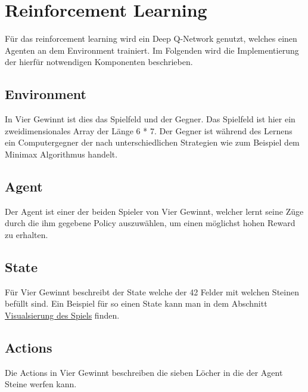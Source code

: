 \section{Reinforcement Learning}
Für das reinforcement learning wird ein Deep Q-Network genutzt, welches einen Agenten an dem Environment trainiert. Im Folgenden wird die Implementierung der hierfür notwendigen Komponenten beschrieben. 


\subsection{Environment}
In Vier Gewinnt ist dies das Spielfeld und der Gegner. Das Spielfeld ist hier ein zweidimensionales Array der Länge 6 * 7. Der Gegner ist während des Lernens ein Computergegner der nach unterschiedlichen Strategien wie zum Beispiel dem Minimax Algorithmus handelt. \\

\subsection{Agent}
Der Agent ist einer der beiden Spieler von Vier Gewinnt, welcher lernt seine Züge durch die ihm gegebene Policy auszuwählen, um einen möglichst hohen Reward zu erhalten.\\

\subsection{State}
 Für Vier Gewinnt beschreibt der State welche der 42 Felder mit welchen Steinen befüllt sind. Ein Beispiel für so einen State kann man in dem Abschnitt \hyperref[sec:visualisierung]{Visualsierung des Spiels} finden.\\


\subsection{Actions}
Die Actions in Vier Gewinnt beschreiben die sieben Löcher in die der Agent Steine werfen kann.\\

